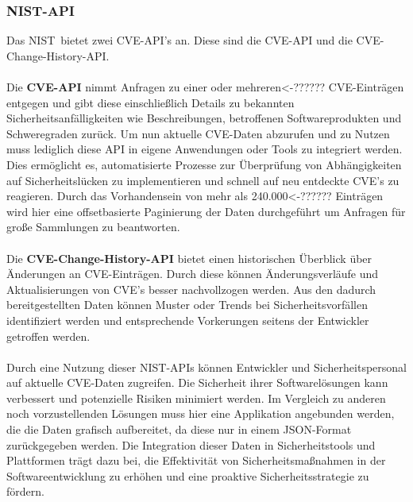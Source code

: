 \subsubsection{NIST-API} \label{sec:NIST-API}
Das \glqq \ac{NIST}\grqq~bietet zwei \ac{CVE}-\ac{API}'s an.
Diese sind die \ac{CVE}-\ac{API} und die \ac{CVE}-Change-History-\ac{API}.
\\ \\
Die \textbf{\ac{CVE}-\ac{API}} nimmt Anfragen zu einer oder mehreren<-?????? \ac{CVE}-Einträgen entgegen und gibt diese einschließlich Details zu bekannten Sicherheitsanfälligkeiten wie Beschreibungen, betroffenen Softwareprodukten und Schweregraden zurück.
Um nun aktuelle \ac{CVE}-Daten abzurufen und zu Nutzen muss lediglich diese \ac{API} in eigene Anwendungen oder Tools zu integriert werden.
Dies ermöglicht es, automatisierte Prozesse zur Überprüfung von Abhängigkeiten auf Sicherheitslücken zu implementieren und schnell auf neu entdeckte \ac{CVE}'s zu reagieren.
Durch das Vorhandensein von mehr als 240.000<-?????? Einträgen wird hier eine offsetbasierte Paginierung der Daten durchgeführt um Anfragen für große Sammlungen zu beantworten.
\\ \\
Die \textbf{\ac{CVE}-Change-History-\ac{API}} bietet einen historischen Überblick über Änderungen an \ac{CVE}-Einträgen.
Durch diese können Änderungsverläufe und Aktualisierungen von \ac{CVE}'s besser nachvollzogen werden.
Aus den dadurch bereitgestellten Daten können Muster oder Trends bei Sicherheitsvorfällen identifiziert werden und entsprechende Vorkerungen seitens der Entwickler getroffen werden.
\\ \\
Durch eine Nutzung dieser \ac{NIST}-\ac{API}s können Entwickler und Sicherheitspersonal auf aktuelle \ac{CVE}-Daten zugreifen.
Die Sicherheit ihrer Softwarelösungen kann verbessert und potenzielle Risiken minimiert werden.
Im Vergleich zu anderen noch vorzustellenden Lösungen muss hier eine Applikation angebunden werden, die die Daten grafisch aufbereitet, da diese nur in einem JSON-Format zurückgegeben werden. 
Die Integration dieser Daten in Sicherheitstools und Plattformen trägt dazu bei, die Effektivität von Sicherheitsmaßnahmen in der Softwareentwicklung zu erhöhen und eine proaktive Sicherheitsstrategie zu fördern.



